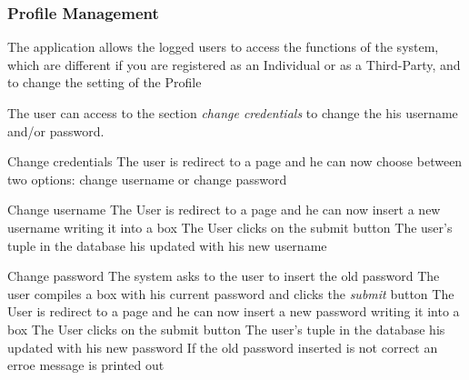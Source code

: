 \documentclass[a4paper]{article}
\begin{document}
        \subsubsection{Profile Management }
        The application allows the logged users to access the functions of the system, which are different if you are registered as an Individual or as a Third-Party, and to change the setting of the Profile
        
        The user can access to the section \textit{change credentials} to change the his username and/or password.
        
        \begin{usecase}{Change credentials}
              {The user is redirect to a page and he can now choose between two options: change username or change password}
       \end{usecase}
       
       \begin{usecase}{Change username}
              {The User is redirect to a page and he can now insert a new username writing it into a box}
              {The User clicks on the submit button}
              {The user's tuple in the database his updated with his new username}
       \end{usecase}
       
       \begin{usecase}{Change password}
              {The system asks to the user to insert the old password}
              {The user compiles a box with his current password and clicks the \textit{submit} button}
              {The User is redirect to a page and he can now insert a new password writing it into a box}
              {The User clicks on the submit button}
              {The user's tuple in the database his updated with his new password}
        {If the old password inserted is not correct an erroe message is printed out}
       \end{usecase}
       
\end{document}
